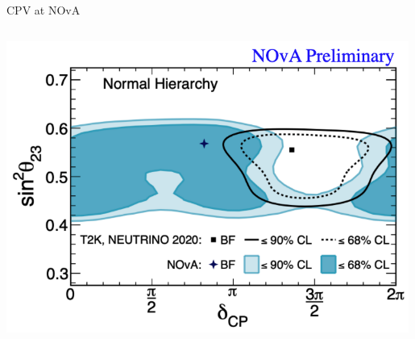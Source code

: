 \begin{frame}{CPV at NOvA}
\begin{columns}[T]
\begin{column}{0.55\textwidth}
      \begin{center}
         \includegraphics[width=0.99\textwidth]{./images/3nu/accelerator/t2k_nova_tensions}\\
      \end{center}

    \end{column}
  \end{columns}

\end{frame}

%
%
%

